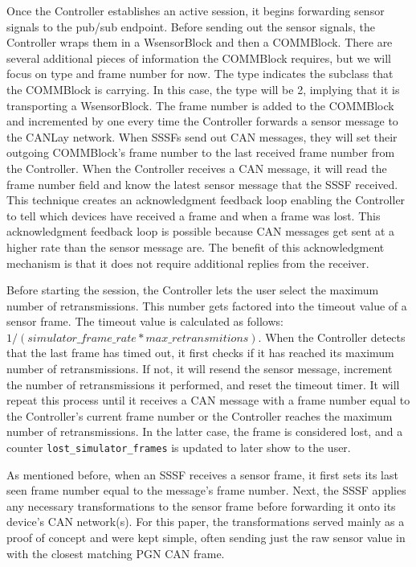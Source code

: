 \documentclass[letterpaper,twocolumn,12pt]{article}
\begin{document}
Once the Controller establishes an active session, it begins forwarding sensor signals to the pub/sub endpoint. Before sending out the sensor signals, the Controller wraps them in a WsensorBlock and then a COMMBlock. There are several additional pieces of information the COMMBlock requires, but we will focus on type and frame number for now. The type indicates the subclass that the COMMBlock is carrying. In this case, the type will be 2, implying that it is transporting a WsensorBlock. The frame number is added to the COMMBlock and incremented by one every time the Controller forwards a sensor message to the CANLay network. When SSSFs send out CAN messages, they will set their outgoing COMMBlock's frame number to the last received frame number from the Controller. When the Controller receives a CAN message, it will read the frame number field and know the latest sensor message that the SSSF received. This technique creates an acknowledgment feedback loop enabling the Controller to tell which devices have received a frame and when a frame was lost. This acknowledgment feedback loop is possible because CAN messages get sent at a higher rate than the sensor message are. 
The benefit of this acknowledgment mechanism is that it does not require additional replies from the receiver.

Before starting the session, the Controller lets the user select the maximum number of retransmissions. This number gets factored into the timeout value of a sensor frame. 
The timeout value is calculated as follows: $1/(simulator\_frame\_rate * max\_retransmitions)$. When the Controller detects that the last frame has timed out, it first checks if it has reached its maximum number of retransmissions. If not, it will resend the sensor message, increment the number of retransmissions it performed, and reset the timeout timer. It will repeat this process until it receives a CAN message with a frame number equal to the Controller's current frame number or the Controller reaches the maximum number of retransmissions. In the latter case, the frame is considered lost, and a counter \texttt{lost\_simulator\_frames} is updated to later show to the user.

As mentioned before, when an SSSF receives a sensor frame, it first sets its last seen frame number equal to the message's frame number. Next, the SSSF applies any necessary transformations to the sensor frame before forwarding it onto its device's CAN network(s). For this paper, the transformations served mainly as a proof of concept and were kept simple, often sending just the raw sensor value in with the closest matching PGN CAN frame.
\end{document}

